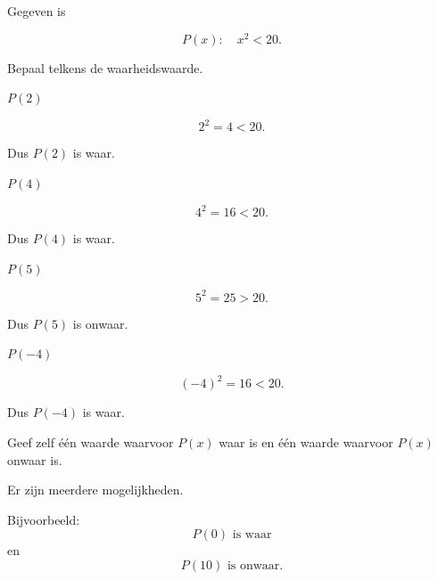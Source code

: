 \documentclass{ximera}
\begin{document}
\begin{oefening}{\oefB \ESS}

Gegeven is

\[
P(x):\quad x^2<20.
\]

Bepaal telkens de waarheidswaarde.

\begin{question}
$P(2)$

\begin{oplossing}
\[
2^2=4<20.
\]

Dus $P(2)$ is waar.
\end{oplossing}
\end{question}


\begin{question}
$P(4)$

\begin{oplossing}
\[
4^2=16<20.
\]

Dus $P(4)$ is waar.
\end{oplossing}
\end{question}


\begin{question}
$P(5)$

\begin{oplossing}
\[
5^2=25>20.
\]

Dus $P(5)$ is onwaar.
\end{oplossing}
\end{question}


\begin{question}
$P(-4)$

\begin{oplossing}
\[
(-4)^2=16<20.
\]

Dus $P(-4)$ is waar.
\end{oplossing}
\end{question}


\begin{question}
Geef zelf één waarde waarvoor $P(x)$ waar is en één waarde waarvoor
$P(x)$ onwaar is.

\begin{oplossing}
Er zijn meerdere mogelijkheden.

Bijvoorbeeld:
\[
P(0)\text{ is waar}
\]
en
\[
P(10)\text{ is onwaar}.
\]
\end{oplossing}
\end{question}

\end{oefening}
\end{document}
